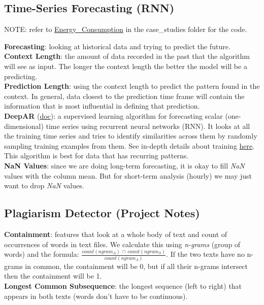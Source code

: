 \documentclass[11pt, a4paper]{article}
\begin{document}
\begin{spacing}{1.1}
	\subsection{Time-Series Forecasting (RNN)}
	\begin{center}
	\color{darkgray} NOTE: refer to \href{file:///E:/Documents/UdacityNotes/ML\%20Engineer/sample_code/case_studies/Energy_Consumption.html}{Energy\_Consumption} in the case\_studies folder for the code. \color{black}
	\end{center}
	\textbf{Forecasting}: looking at historical data and trying to predict the future.\vspace*{2mm}\\
	\textbf{Context Length}: the amount of data recorded in the past that the algorithm will see as input. The longer the context length the better the model will be a predicting. \vspace*{2mm}\\
	\textbf{Prediction Length}: using the context length to predict the pattern found in the context. In general, data closest to the prediction time frame will contain the information that is most influential in defining that prediction. \vspace*{2mm}\\
	\textbf{DeepAR} (\href{https://docs.aws.amazon.com/sagemaker/latest/dg/deepar.html}{doc}): a supervised learning algorithm for forecasting scalar (one-dimensional) time series using recurrent neural networks (RNN). It looks at all the training time series and tries to identify similarities across them by randomly sampling training examples from them. See in-depth details about training \href{https://docs.aws.amazon.com/sagemaker/latest/dg/deepar_how-it-works.html}{here}. This algorithm is best for data that has recurring patterns. \vspace*{2mm}\\
	\textbf{NaN Values}: since we are doing long-term forecasting, it is okay to fill \textit{NaN} values with the column mean. But for short-term analysis (hourly) we may just want to drop \textit{NaN} values.\vspace*{2mm}
	
	\subsection{Plagiarism Detector (Project Notes)}
	\textbf{Containment}: features that look at a whole body of text and count of occurrences of words in text files. We calculate this using \textit{n-grams} (group of words) and the formula: $\frac{count(ngram_A)\,\cap\, count(ngram_S)}{count(ngram_A)}$. If the two texts have no n-grams in common, the containment will be 0, but if all their n-grams intersect then the containment will be 1.\vspace*{2mm}\\
	\textbf{Longest Common Subsequence}: the longest sequence (left to right) that appears in both texts (words don't have to be continuous). \newpage

	
	
	
	
	
	
	
	
	
	
	
	
	
	
\end{spacing}
\end{document}
